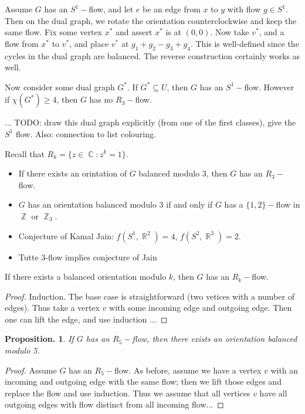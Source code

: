 \documentclass[11pt, a4paper]{memoir}
\DeclareMathOperator{\Z}{{\mathbb{Z}}}
\DeclareMathOperator{\R}{{\mathbb{R}}}
\DeclareMathOperator{\C}{{\mathbb{C}}}
\theoremstyle{change}
\newtheorem{proposition}[theorem]{Proposition.}
\theoremstyle{plain}
\theoremstyle{nonumberplain}
\newtheorem{proof}{Proof}
\numberwithin{equation}{section}
\begin{document}
Assume $G$ has an $S^1-$flow, and let $e$ be an edge from $x$ to $y$ with flow $g\in S^1$.
Then on the dual graph, we rotate the orientation counterclockwise and keep the same flow.
Fix some vertex $x^*$ and assert $x^*$ is at $(0,0)$.
Now take $v^*$, and a flow from $x^*$ to $v^*$, and place $v^*$ at $g_1+g_2-g_3+g_4$.
This is well-defined since the cycles in the dual graph are balanced.
The reverse construction certainly works as well.

Now consider some dual graph $G^*$.
If $G^*\subseteq U$, then $G$ has an $S^1-$flow.
However if $\chi(G^*)\geq 4$, then $G$ has no $R_3-$flow.

... TODO: draw this dual graph explicitly (from one of the first classes), give the $S^1$ flow.
Also: connection to list colouring.

Recall that $R_k=\{z\in\C:z^k=1\}$.
\begin{itemize}[nl]
    \item If there exists an orintation of $G$ balanced modulo 3, then $G$ has an $R_3-$flow.
    \item$G$ has an orientation balanced modulo 3 if and only if $G$ has a $\{1,2\}-$flow in $\Z$ or $\Z_3$.
    \item Conjecture of Kamal Jain: $f(S^1,\R^2)=4$, $f(S^2,\R^3)=2$.
    \item Tutte 3-flow implies conjecture of Jain
\end{itemize}
If there exists a balanced orientation modulo $k$, then $G$ has an $R_k-$flow.
\begin{proof}
    Induction.
    The base case is straightforward (two vetices with a number of edges).
    Thus take a vertex $v$ with some incoming edge and outgoing edge.
    Then one can lift the edge, and use induction ...
\end{proof}
\begin{proposition}
    If $G$ has an $R_5-$flow, then there exists an orientation balanced modulo 5.
\end{proposition}
\begin{proof}
    Assume $G$ has an $R_5-$flow.
    As before, assume we have a vertex $v$ with an incoming and outgoing edge with the same flow; then we lift those edges and replace the flow and use induction.
    Thus we assume that all vertices $v$ have all outgoing edges with flow distinct from all incoming flow...
\end{proof}
\end{document}
